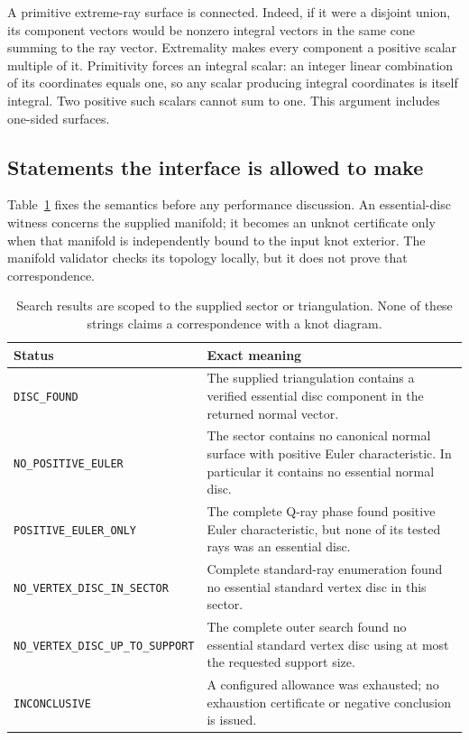 \documentclass[11pt]{article}
\theoremstyle{definition}
\theoremstyle{remark}
\newcommand{\code}[1]{\texttt{#1}}
\begin{document}
A primitive extreme-ray surface is connected. Indeed, if it were a disjoint
union, its component vectors would be nonzero integral vectors in the same
cone summing to the ray vector. Extremality makes every component a positive
scalar multiple of it. Primitivity forces an integral scalar: an integer
linear combination of its coordinates equals one, so any scalar producing
integral coordinates is itself integral. Two positive such scalars cannot
sum to one. This argument includes one-sided surfaces.

\subsection{Statements the interface is allowed to make}

Table~\ref{tab:statuses} fixes the semantics before any performance discussion.
An essential-disc witness concerns the supplied manifold; it becomes an unknot
certificate only when that manifold is independently bound to the input knot
exterior. The manifold validator checks its topology locally, but it does not
prove that correspondence.

\begin{table}[ht]
\centering\small
\begin{tabularx}{\textwidth}{@{}p{}X@{}}
\toprule
Status & Exact meaning \\
\midrule
\code{DISC\_FOUND} & The supplied triangulation contains a verified essential
disc component in the returned normal vector. \\
\code{NO\_POSITIVE\_EULER} & The sector contains no canonical normal surface
with positive Euler characteristic. In particular it contains no essential
normal disc. \\
\code{POSITIVE\_EULER\_ONLY} & The complete Q-ray phase found positive Euler
characteristic, but none of its tested rays was an essential disc. \\
\code{NO\_VERTEX\_DISC\_IN\_SECTOR} & Complete standard-ray enumeration found
no essential standard vertex disc in this sector. \\
\code{NO\_VERTEX\_DISC\_UP\_TO\_SUPPORT} & The complete outer search found no
essential standard vertex disc using at most the requested support size. \\
\code{INCONCLUSIVE} & A configured allowance was exhausted; no exhaustion
certificate or negative conclusion is issued. \\
\bottomrule
\end{tabularx}
\caption{Search results are scoped to the supplied sector or triangulation.
None of these strings claims a correspondence with a knot diagram.}
\label{tab:statuses}
\end{table}
\end{document}
